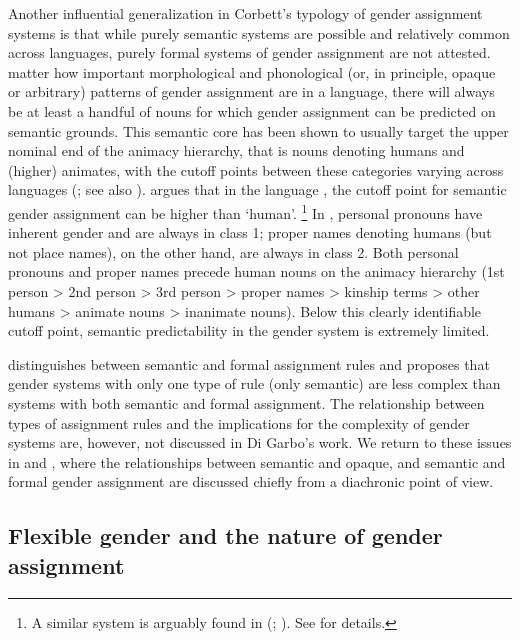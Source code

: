 \documentclass[output=collectionpaper]{langsci/langscibook}
\begin{document}
Another influential generalization in Corbett's typology of gender assignment systems is that while purely semantic systems are possible and relatively common across languages, purely formal systems of gender assignment are not attested.  matter how important morphological and phonological (or, in principle, opaque or arbitrary) patterns of gender assignment are in a language, there will always be at least a handful of nouns for which gender assignment can be predicted on semantic grounds. This semantic core has been shown to usually target the upper nominal end of the animacy hierarchy, that is nouns denoting humans and (higher) animates, with the cutoff points between these categories varying across languages (\citealt{Dahl2000a}; see also ).  argues that in the  language , the cutoff point for semantic gender assignment can be higher than `human'.%
\footnote{%
A similar system is arguably found in  (; ). See \cite[note 3, 591--592]{Dahl2000} for details.
} %
In , personal pronouns have inherent gender and are always in class 1; proper names denoting humans (but not place names), on the other hand, are always in class 2. Both personal pronouns and proper names precede human nouns on the animacy hierarchy (1st person > 2nd person > 3rd person > proper names > kinship terms > other humans > animate nouns > inanimate nouns). Below this clearly identifiable cutoff point, semantic predictability in the  gender system is extremely limited.

\citet{DiGarbo2014,DiGarbo2016} distinguishes between semantic and formal assignment rules and proposes that gender systems with only one type of rule (only semantic) are less complex than systems with both semantic and formal assignment. The relationship between types of assignment rules and the implications for the complexity of gender systems are, however, not discussed in Di Garbo's work. We return to these issues in  and , where the relationships between semantic and opaque, and semantic and formal gender assignment are discussed chiefly from a diachronic point of view.

  \subsection{Flexible gender and the nature of gender assignment}
\label{sec:WDG:5.2}
\end{document}
